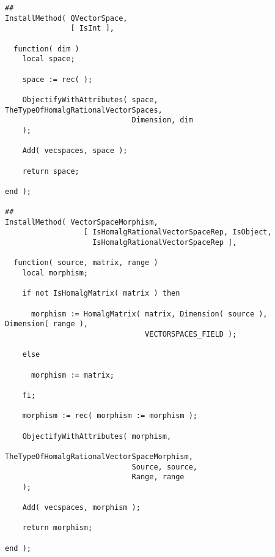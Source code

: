 \begin{small}
\begin{Verbatim}[frame=single]
##
InstallMethod( QVectorSpace,
               [ IsInt ],
               
  function( dim )
    local space;
    
    space := rec( );
    
    ObjectifyWithAttributes( space, TheTypeOfHomalgRationalVectorSpaces,
                             Dimension, dim 
    );
    
    Add( vecspaces, space );
    
    return space;
    
end );

##
InstallMethod( VectorSpaceMorphism,
                  [ IsHomalgRationalVectorSpaceRep, IsObject,
                    IsHomalgRationalVectorSpaceRep ],
                  
  function( source, matrix, range )
    local morphism;

    if not IsHomalgMatrix( matrix ) then
    
      morphism := HomalgMatrix( matrix, Dimension( source ), Dimension( range ),
                                VECTORSPACES_FIELD );

    else

      morphism := matrix;

    fi;

    morphism := rec( morphism := morphism );
    
    ObjectifyWithAttributes( morphism,
                             TheTypeOfHomalgRationalVectorSpaceMorphism,
                             Source, source,
                             Range, range 
    );

    Add( vecspaces, morphism );
    
    return morphism;
    
end );
\end{Verbatim}
\end{small}